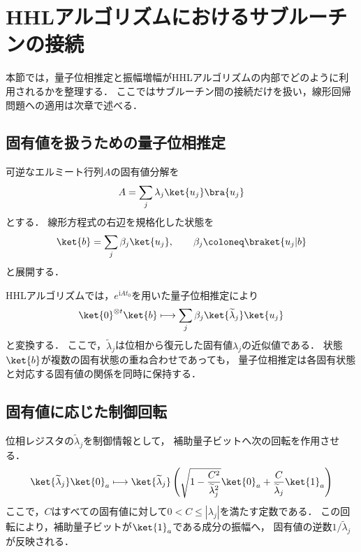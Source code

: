 \section{HHLアルゴリズムにおけるサブルーチンの接続}
\label{sec:subroutines-in-hhl}

本節では，量子位相推定と振幅増幅がHHLアルゴリズムの内部でどのように利用されるかを整理する．
ここではサブルーチン間の接続だけを扱い，線形回帰問題への適用は次章で述べる．

\subsection{固有値を扱うための量子位相推定}
\label{subsec:qpe-role-in-hhl}

可逆なエルミート行列$A$の固有値分解を
\begin{align*}
  A
  =
  \sum_j\lambda_j\ket{u_j}\bra{u_j}
\end{align*}
とする．
線形方程式の右辺を規格化した状態を
\begin{equation}
  \ket{b}
  =
  \sum_j\beta_j\ket{u_j},
  \qquad
  \beta_j
  \coloneq
  \braket{u_j|b}
  \label{eq:hhl-b-eigenstate-expansion-subroutine}
\end{equation}
と展開する．

HHLアルゴリズムでは，$e^{\mathrm{i}At_0}$を用いた量子位相推定により
\begin{equation}
  \ket{0}^{\otimes t}\ket{b}
  \longmapsto
  \sum_j\beta_j
  \ket{\widetilde{\lambda}_j}\ket{u_j}
  \label{eq:hhl-qpe-subroutine-map}
\end{equation}
と変換する\cite{hhl2009}．
ここで，$\widetilde{\lambda}_j$は位相から復元した固有値$\lambda_j$の近似値である．
状態$\ket{b}$が複数の固有状態の重ね合わせであっても，
量子位相推定は各固有状態と対応する固有値の関係を同時に保持する．

\subsection{固有値に応じた制御回転}
\label{subsec:controlled-rotation-after-qpe}

位相レジスタの$\widetilde{\lambda}_j$を制御情報として，
補助量子ビットへ次の回転を作用させる．
\begin{equation}
  \ket{\widetilde{\lambda}_j}\ket{0}_{a}
  \longmapsto
  \ket{\widetilde{\lambda}_j}
  \left(
    \sqrt{1-\frac{C^2}{\widetilde{\lambda}_j^2}}\ket{0}_{a}
    +\frac{C}{\widetilde{\lambda}_j}\ket{1}_{a}
  \right)
  \label{eq:hhl-controlled-rotation-subroutine}
\end{equation}
ここで，$C$はすべての固有値に対して$0<C\leq|\lambda_j|$を満たす定数である．
この回転により，補助量子ビットが$\ket{1}_{a}$である成分の振幅へ，
固有値の逆数$1/\widetilde{\lambda}_j$が反映される．

